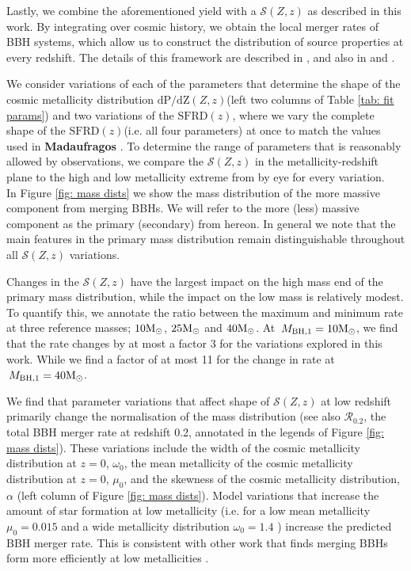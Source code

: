 \documentclass[twocolumn]{aastex631}
\newcommand{\Msun}{\ensuremath{\rm{M}_{\odot}}\xspace}
\newcommand{\Mbheen}{\ensuremath{\,M_{\rm BH, 1}}\xspace}
\newcommand{\SFRDzZ}{\ensuremath{\mathcal{S}(Z,z)}\xspace}
\newcommand{\SFRDz}{\ensuremath{\mathrm{SFRD}(z)}\xspace}
\newcommand{\dpdZ}{\ensuremath{\mathrm{dP/dZ}(Z,z)}\xspace}
\newcommand{\todo}[1]{{\color{purple}\bf{#1}}}
\begin{document}
Lastly, we combine the aforementioned yield with a \SFRDzZ as described in this work. By integrating over cosmic history, we obtain the local merger rates of BBH systems, which allow us to construct the distribution of source properties at every redshift. The details of this framework are described in \cite{vanson+2022}, and also in \cite{Broekgaarden+2021a} and \cite{Neijssel+2019}. 

We consider variations of each of the parameters that determine the shape of the cosmic metallicity distribution \dpdZ (left two columns of Table \ref{tab: fit params}) and two variations of the \SFRDz, where we vary the complete shape of the \SFRDz (i.e. all four parameters) at once to match the values used in \todo{Madaufragos} \cite{Neijssel2019}. To determine the range of parameters that is reasonably allowed by observations, we compare the \SFRDzZ in the metallicity-redshift plane to the high and low metallicity extreme from \cite{Chruslinska+2021} by eye for every variation. \\


In Figure \ref{fig: mass dists} we show the mass distribution of the more massive component from merging BBHs. We will refer to the more (less) massive component as the primary (secondary) from hereon. 
In general we note that the main features in the primary mass distribution remain distinguishable throughout all \SFRDzZ variations. 


Changes in the \SFRDzZ have the largest impact on the high mass end of the primary mass distribution, while the impact on the low mass is relatively modest.
To quantify this, we annotate the ratio between the maximum and minimum rate at three reference masses; $10\Msun$, $25\Msun$ and $40\Msun$. 
At $\Mbheen=10\Msun$, we find that the rate changes by at most a factor 3 for the variations explored in this work. While we find a factor of at most 11 for the change in rate at $\Mbheen=40\Msun$. 


We find that parameter variations that affect shape of \SFRDzZ at low redshift primarily change the normalisation of the mass distribution (see also  $\mathcal{R}_{0.2}$, the total BBH merger rate at redshift 0.2, annotated in the legends of Figure \ref{fig: mass dists}). 
These variations include the width of the cosmic metallicity distribution at $z=0$, $\omega_0$, the mean metallicity of the cosmic metallicity distribution at $z=0$, $\mu_0$, and the skewness of the cosmic metallicity distribution, $\alpha$ (left column of Figure \ref{fig: mass dists}).
Model variations that increase the amount of star formation at low metallicity (i.e. for a low mean metallicity $\mu_0=0.015$ and a wide metallicity distribution $\omega_0 = 1.4$ ) increase the predicted BBH merger rate. This is consistent with other work that finds merging BBHs form more efficiently at low metallicities \citep[e.g.][]{BelczynskiVink2010, Stevenson+2017,Mapelli2017,Chruslinska2019_effectCO,Broekgaarden+2021b}.
\end{document}
